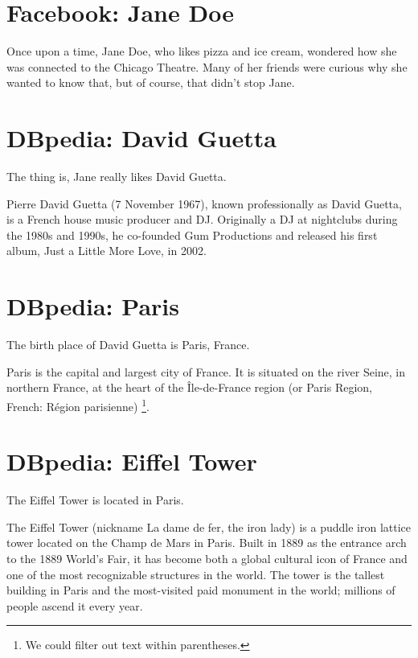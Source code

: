 \documentclass{article}
\begin{document}
\section{Facebook: Jane Doe}
Once upon a time,
Jane Doe,
who likes pizza and ice cream,
wondered how she was connected to the Chicago Theatre.
Many of her friends were curious
why she wanted to know that,
but of course, that didn't stop
Jane.

\section{DBpedia: David Guetta}
The thing is,
Jane really likes David Guetta.

Pierre David Guetta (7 November 1967), known professionally as David Guetta, is a French house music producer and DJ. Originally a DJ at nightclubs during the 1980s and 1990s, he co-founded Gum Productions and released his first album, Just a Little More Love, in 2002.

\section{DBpedia: Paris}
The birth place of David Guetta is Paris, France.

Paris is the capital and largest city of France. It is situated on the river Seine, in northern France, at the heart of the Île-de-France region (or Paris Region, French: Région parisienne)%
\footnote{We could filter out text within parentheses.}.

\section{DBpedia: Eiffel Tower}
The Eiffel Tower is located in Paris.

The Eiffel Tower (nickname La dame de fer, the iron lady) is a puddle iron lattice tower located on the Champ de Mars in Paris. Built in 1889 as the entrance arch to the 1889 World's Fair, it has become both a global cultural icon of France and one of the most recognizable structures in the world. The tower is the tallest building in Paris and the most-visited paid monument in the world; millions of people ascend it every year.
\end{document}
